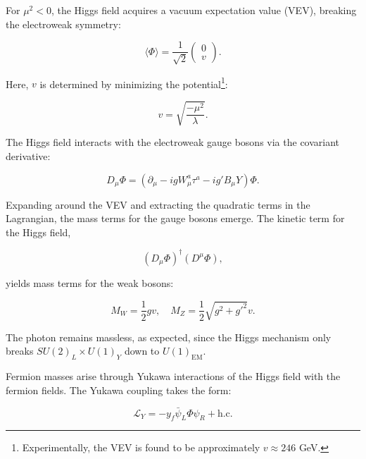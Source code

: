 For \( \mu^2 < 0 \), the Higgs field acquires a vacuum expectation value (VEV), breaking the electroweak symmetry:

\begin{equation}
\label{eq:higgssymmetry}
\langle \Phi \rangle = \frac{1}{\sqrt{2}} \begin{pmatrix} 0 \\ v \end{pmatrix}.
\end{equation}

Here, \( v \) is determined by minimizing the potential\footnote{Experimentally, the VEV is found to be approximately \( v \approx 246 \) GeV.}:

\begin{equation}
\label{eq:higgspotmin}
v = \sqrt{\frac{-\mu^2}{\lambda}}.
\end{equation}

The Higgs field interacts with the electroweak gauge bosons via the covariant derivative:

\begin{equation}
\label{eq:higgscovder}
D_\mu \Phi = \left( \partial_\mu - i g W^a_\mu \tau^a - i g' B_\mu Y \right) \Phi.
\end{equation}

Expanding around the VEV and extracting the quadratic terms in the Lagrangian, the mass terms for the gauge bosons emerge. The kinetic term for the Higgs field, 

\begin{equation}
\label{eq:higgskinetic}
(D_\mu \Phi)^\dagger (D^\mu \Phi),
\end{equation}

yields mass terms for the weak bosons:

\begin{equation}
\label{eq:higgsweakmass}
M_W = \frac{1}{2} g v, \quad M_Z = \frac{1}{2} \sqrt{g^2 + g'^2} v.
\end{equation}

The photon remains massless, as expected, since the Higgs mechanism only breaks \( SU(2)_L \times U(1)_Y \) down to \( U(1)_{\text{EM}} \).

Fermion masses arise through Yukawa interactions of the Higgs field with the fermion fields. The Yukawa coupling takes the form:

\begin{equation}
\label{eq:higgsyukawa}
\mathcal{L}_Y = - y_f \bar{\psi}_L \Phi \psi_R + \text{h.c.}
\end{equation}

